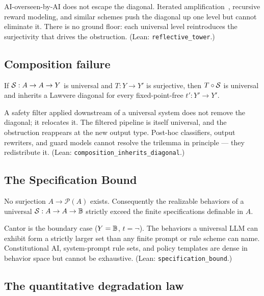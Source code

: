 AI-overseen-by-AI does not escape the diagonal. Iterated amplification~\citep{christiano2018amplification}, recursive reward modeling, and similar schemes push the diagonal up one level but cannot eliminate it. There is no ground floor: each universal level reintroduces the surjectivity that drives the obstruction. (Lean: \texttt{reflective\_tower}.)

\subsection{Composition failure}
\label{subsec:composition}

\begin{theorem}
\label{thm:composition}
If $\mathcal{S} : A \to A \to Y$ is universal and $T : Y \to Y'$ is surjective, then $T \circ \mathcal{S}$ is universal and inherits a Lawvere diagonal for every fixed-point-free $t' : Y' \to Y'$.
\end{theorem}

A safety filter applied downstream of a universal system does not remove the diagonal; it relocates it. The filtered pipeline is itself universal, and the obstruction reappears at the new output type. Post-hoc classifiers, output rewriters, and guard models cannot resolve the trilemma in principle --- they redistribute it. (Lean: \texttt{composition\_inherits\_diagonal}.)

\subsection{The Specification Bound}
\label{subsec:specification}

\begin{theorem}
\label{thm:specification}
No surjection $A \to \mathcal{P}(A)$ exists. Consequently the realizable behaviors of a universal $\mathcal{S} : A \to A \to \mathbb{B}$ strictly exceed the finite specifications definable in $A$.
\end{theorem}

Cantor is the boundary case ($Y = \mathbb{B}$, $t = \neg$). The behaviors a universal LLM can exhibit form a strictly larger set than any finite prompt or rule scheme can name. Constitutional AI, system-prompt rule sets, and policy templates are dense in behavior space but cannot be exhaustive. (Lean: \texttt{specification\_bound}.)

\subsection{The quantitative degradation law}
\label{subsec:quantitative}

